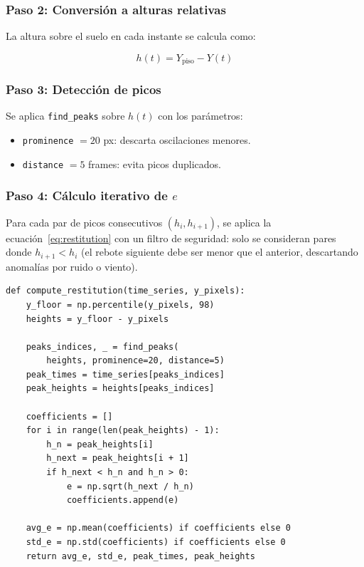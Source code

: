 \documentclass[12pt,a4paper]{article}
\begin{document}
\subsubsection{Paso 2: Conversión a alturas relativas}

La altura sobre el suelo en cada instante se calcula como:

\begin{equation}
    h(t) = Y_{\text{piso}} - Y(t)
\end{equation}

\subsubsection{Paso 3: Detección de picos}

Se aplica \texttt{find\_peaks} sobre $h(t)$ con los parámetros:
\begin{itemize}
    \item \texttt{prominence} $= 20$ px: descarta oscilaciones menores.
    \item \texttt{distance} $= 5$ frames: evita picos duplicados.
\end{itemize}

\subsubsection{Paso 4: Cálculo iterativo de $e$}

Para cada par de picos consecutivos $(h_i, h_{i+1})$, se aplica la ecuación~\eqref{eq:restitution} con un filtro de seguridad: solo se consideran pares donde $h_{i+1} < h_i$ (el rebote siguiente debe ser menor que el anterior, descartando anomalías por ruido o viento).

\begin{lstlisting}[caption={Cálculo del coeficiente de restitución.}]
def compute_restitution(time_series, y_pixels):
    y_floor = np.percentile(y_pixels, 98)
    heights = y_floor - y_pixels

    peaks_indices, _ = find_peaks(
        heights, prominence=20, distance=5)
    peak_times = time_series[peaks_indices]
    peak_heights = heights[peaks_indices]

    coefficients = []
    for i in range(len(peak_heights) - 1):
        h_n = peak_heights[i]
        h_next = peak_heights[i + 1]
        if h_next < h_n and h_n > 0:
            e = np.sqrt(h_next / h_n)
            coefficients.append(e)

    avg_e = np.mean(coefficients) if coefficients else 0
    std_e = np.std(coefficients) if coefficients else 0
    return avg_e, std_e, peak_times, peak_heights
\end{lstlisting}
\end{document}
